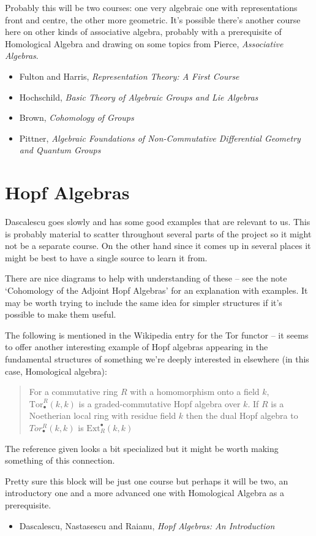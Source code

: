 \documentclass[article]{article}
\begin{document}
Probably this will be two courses: one very algebraic one with representations front and centre, the other more geometric. It's possible there's another course here on other kinds of associative algebra, probably with a prerequisite of Homological Algebra and drawing on some topics from Pierce, \textit{Associative Algebras}.

\begin{itemize}
	\item[]{Fulton and Harris, \textit{Representation Theory: A First Course}}
	\item[]{Hochschild, \textit{Basic Theory of Algebraic Groups and Lie Algebras}}
	\item[]{Brown, \textit{Cohomology of Groups}}
	\item[]{Pittner, \textit{Algebraic Foundations of Non-Commutative Differential Geometry and Quantum Groups}}
\end{itemize}

\section{Hopf Algebras}

Dascalescu goes slowly and has some good examples that are relevant to us. This is probably material to scatter throughout several parts of the project so it might not be a separate course. On the other hand since it comes up in several places it might be best to have a single source to learn it from.

There are nice diagrams to help with understanding of these -- see the note `Cohomology of the Adjoint Hopf Algebras' for an explanation with examples. It may be worth trying to include the same idea for simpler structures if it's possible to make them useful.

The following is mentioned in the Wikipedia entry for the Tor functor -- it seems to offer another interesting example of Hopf algebras appearing in the fundamental structures of something we're deeply interested in elsewhere (in this case, Homological algebra):
\begin{quote}
	For a commutative ring $R$ with a homomorphism onto a field $k$, $\text{Tor}_\bullet^R(k, k)$ is a graded-commutative Hopf algebra over $k$. If $R$ is a Noetherian local ring with residue field $k$ then the dual Hopf algebra to $Tor_\bullet^R(k,k)$ is $\text{Ext}^\bullet_R(k, k)$
\end{quote}
The reference given looks a bit specialized but it might be worth making something of this connection.

Pretty sure this block will be just one course but perhaps it will be two, an introductory one and a more advanced one with Homological Algebra as a prerequisite.

\begin{itemize}
	\item[]{Dascalescu, Nastasescu and Raianu, \textit{Hopf Algebras: An Introduction}}
\end{itemize}
\end{document}
